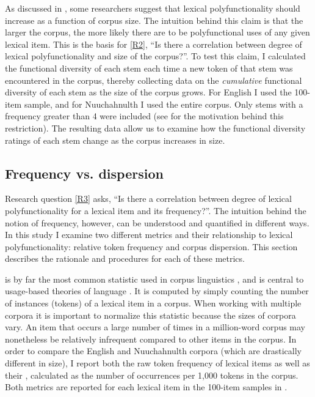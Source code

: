 As discussed in , some researchers suggest that lexical polyfunctionality should increase as a function of corpus size. The intuition behind this claim is that the larger the corpus, the more likely there are to be polyfunctional uses of any given lexical item. This is the basis for \ref{R2}, \enquote{Is there a correlation between degree of lexical polyfunctionality and size of the corpus?}. To test this claim, I calculated the functional diversity of each stem each time a new token of that stem was encountered in the corpus, thereby collecting data on the \emph{cumulative} functional diversity of each stem as the size of the corpus grows. For English I used the 100-item sample, and for Nuuchahnulth I used the entire corpus. Only stems with a frequency greater than 4 were included (see  for the motivation behind this restriction). The resulting data allow us to examine how the functional diversity ratings of each stem change as the corpus increases in size.

\subsection{Frequency vs. dispersion}
\label{sec:3.4.3}

Research question \ref{R3} asks, \enquote{Is there a correlation between degree of lexical polyfunctionality for a lexical item and its frequency?}. The intuition behind the notion of frequency, however, can be understood and quantified in different ways. In this study I examine two different metrics and their relationship to lexical polyfunctionality: relative token frequency and corpus dispersion. This section describes the rationale and procedures for each of these metrics.

 is by far the most common statistic used in corpus linguistics \parencite[403]{Gries2008}, and is central to usage-based theories of language \parencites{Bybee1985}{Tomasello2003}{Goldberg2006}{Bybee2007}{Bybee2010}{Diessel2019}. It is computed by simply counting the number of instances (tokens) of a lexical item in a corpus. When working with multiple corpora it is important to normalize this statistic because the sizes of corpora vary. An item that occurs a large number of times in a million-word corpus may nonetheless be relatively infrequent compared to other items in the corpus. In order to compare the English and Nuuchahnulth corpora (which are drastically different in size), I report both the raw token frequency of lexical items as well as their , calculated as the number of occurrences per 1,000 tokens in the corpus. Both metrics are reported for each lexical item in the 100-item samples in .

